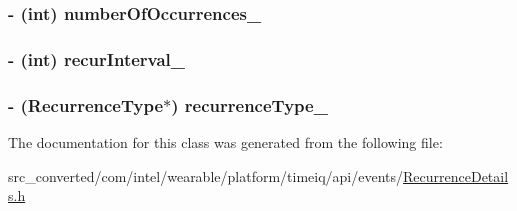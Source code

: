 \subsubsection[{number\+Of\+Occurrences\+\_\+}]{\setlength{\rightskip}{0pt plus 5cm}-\/ (int) number\+Of\+Occurrences\+\_\+}\label{interface_recurrence_details_a069d44e29db24a692de7dc52827aa97f}
\hypertarget{interface_recurrence_details_ac05f6947e459bf10d6e0d2c98a592417}{}
\subsubsection[{recur\+Interval\+\_\+}]{\setlength{\rightskip}{0pt plus 5cm}-\/ (int) recur\+Interval\+\_\+}\label{interface_recurrence_details_ac05f6947e459bf10d6e0d2c98a592417}
\hypertarget{interface_recurrence_details_a67e0532d0c70d4f000804c091c468b53}{}
\subsubsection[{recurrence\+Type\+\_\+}]{\setlength{\rightskip}{0pt plus 5cm}-\/ ({\bf Recurrence\+Type}$\ast$) recurrence\+Type\+\_\+}\label{interface_recurrence_details_a67e0532d0c70d4f000804c091c468b53}


The documentation for this class was generated from the following file\+:\begin{DoxyCompactItemize}
\item 
src\+\_\+converted/com/intel/wearable/platform/timeiq/api/events/\hyperlink{_recurrence_details_8h}{Recurrence\+Details.\+h}\end{DoxyCompactItemize}
